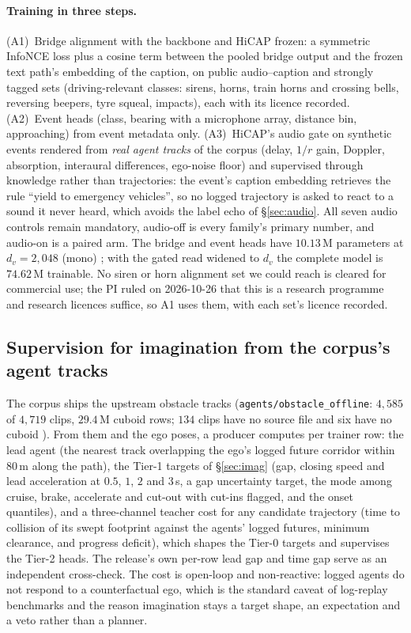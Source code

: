 \paragraph{Training in three steps.} (A1)~Bridge alignment with the backbone and HiCAP frozen: a symmetric InfoNCE loss plus a cosine term between the pooled bridge output and the frozen text path's embedding of the caption, on public audio--caption and strongly tagged sets (driving-relevant classes: sirens, horns, train horns and crossing bells, reversing beepers, tyre squeal, impacts), each with its licence recorded. (A2)~Event heads (class, bearing with a microphone array, distance bin, approaching) from event metadata only. (A3)~HiCAP's audio gate on synthetic events rendered from \emph{real agent tracks} of the corpus (delay, $1/r$ gain, Doppler, absorption, interaural differences, ego-noise floor) and supervised through knowledge rather than trajectories: the event's caption embedding retrieves the rule ``yield to emergency vehicles'', so no logged trajectory is asked to react to a sound it never heard, which avoids the label echo of \S\ref{sec:audio}. All seven audio controls remain mandatory, audio-off is every family's primary number, and audio-on is a paired arm. The bridge and event heads have $10.13$\,M parameters at $d_v=2{,}048$ (mono) \evM; with the gated read widened to $d_v$ the complete model is $74.62$\,M trainable. No siren or horn alignment set we could reach is cleared for commercial use; the PI ruled on 2026-10-26 that this is a research programme and research licences suffice, so A1 uses them, with each set's licence recorded.

\subsection{Supervision for imagination from the corpus's agent tracks}\label{sec:imag-supervision}
The corpus ships the upstream obstacle tracks (\texttt{agents/obstacle\_offline}: $4{,}585$ of $4{,}719$ clips, $29.4$\,M cuboid rows; $134$ clips have no source file and six have no cuboid \evM). From them and the ego poses, a producer computes per trainer row: the lead agent (the nearest track overlapping the ego's logged future corridor within $80$\,m along the path), the Tier-1 targets of \S\ref{sec:imag} (gap, closing speed and lead acceleration at $0.5$, $1$, $2$ and $3$\,s, a gap uncertainty target, the mode among cruise, brake, accelerate and cut-out with cut-ins flagged, and the onset quantiles), and a three-channel teacher cost for any candidate trajectory (time to collision of its swept footprint against the agents' logged futures, minimum clearance, and progress deficit), which shapes the Tier-0 targets and supervises the Tier-2 heads. The release's own per-row lead gap and time gap serve as an independent cross-check. The cost is open-loop and non-reactive: logged agents do not respond to a counterfactual ego, which is the standard caveat of log-replay benchmarks and the reason imagination stays a target shape, an expectation and a veto rather than a planner.

